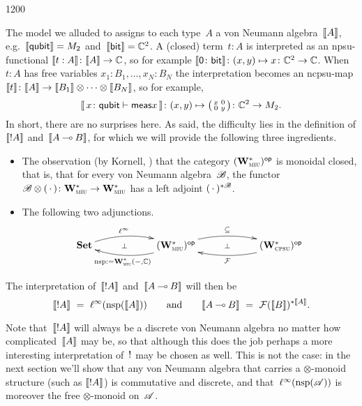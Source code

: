 \begin{parsec}{1200}
\begin{point}{10}
The model
we alluded to
assigns to each type~$A$ a von Neumann algebra~$\llbracket A\rrbracket$,%
e.g.~$\llbracket\mathsf{qubit}\rrbracket=M_2$
and~$\llbracket\mathsf{bit}\rrbracket=\mathbb{C}^2$.
A (closed) term~$t:A$
is interpreted as an npsu-functional $\llbracket t:A\rrbracket\colon \llbracket A\rrbracket\to\mathbb{C}$,
so for example $\llbracket\mathsf{0}\colon \mathsf{bit}\rrbracket\colon
(x,y)\mapsto x\colon \mathbb{C}^2\to\mathbb{C}$.
When~$t:A$ has free variables $x_1:B_1,\dotsc,x_N:B_N$
the interpretation 
becomes an ncpsu-map $\llbracket t\rrbracket\colon \llbracket A\rrbracket\to\llbracket B_1\rrbracket\otimes 
\dotsb \otimes \llbracket B_N\rrbracket$,
so for example,
\begin{equation*}
	\llbracket\, x\colon \mathsf{qubit} \vdash \mathsf{meas} x\,\rrbracket
\colon (x,y)\mapsto
\smash{\bigl(
	\begin{smallmatrix}x& 0 \\ 0 & y
	\end{smallmatrix}\bigr)}
\colon \mathbb{C}^2\to M_2.
\end{equation*}
In short, there are no surprises here.
As said, the difficulty lies
in the definition
of $\llbracket!A\rrbracket$ and~$\llbracket A\mathbin{\multimap} B\rrbracket$,
for which we will provide the following
three ingredients.
\begin{itemize}
\item
The observation (by Kornell, \cite{kornell2012})
that
the category 
${(\mathbf{W}^*_{\text{\textsc{miu}}})}{^{\mathsf{op}}}$
is monoidal closed,
that is,
that
for every von Neumann algebra~$\mathscr{B}$,
the functor
$\mathscr{B}\otimes (\,\cdot\,)\colon 
\mathbf{W}^*_{\text{\textsc{miu}}}\to \mathbf{W}^*_{\text{\textsc{miu}}}$
has a left adjoint
$(\,\cdot\,)^{*\mathscr{B}}$.

\item
The following two adjunctions.
\begin{equation*}
\xymatrix@C=6em{
	\Cat{Set}
	\ar@/^1.0em/[r]^-{\ell^\infty}
	\ar@{}[r]|-{\perp}
	&
	\op{(\W{miu})}
	\ar@/^1.0em/[r]^-{\subseteq}
	\ar@/^1.0em/[l]^-{\nsp:=\W{miu}(-,\C)}
	\ar@{}[r]|-{\perp}
	&
	\op{(\W{cpsu})}
	\ar@/^1.0em/[l]^-{\mathcal{F}}
}
\end{equation*}
\end{itemize}
\end{point}
The interpretation of~$\llbracket!A\rrbracket$
and~$\llbracket A\mathbin{\multimap} B\rrbracket$ will then be
\begin{equation*}
\sem{!A}\ =\ 
\linf(\nsp(\sem{A}))
\qquad\text{and}\qquad
\sem{A\limp B}
\ = \ 
\mathcal{F}(\sem{B})^{*\sem{A}}.
\end{equation*}

Note that~$\llbracket!A\rrbracket$
will always be a discrete von Neumann algebra
no matter how complicated~$\llbracket A\rrbracket$ may be,
so that although this does the job
perhaps a more interesting interpretation of~$\mathord{!}$
may be chosen as well.
This is not the case:
in the next
section we'll show that
any von Neumann algebra
that carries 
a $\otimes$-monoid structure
(such as $\llbracket!A\rrbracket$)
is commutative and discrete,
and that~$\ell^\infty(\mathrm{nsp}(\mathscr{A}))$
is moreover the free $\otimes$-monoid
on~$\mathscr{A}$.
\end{parsec}
